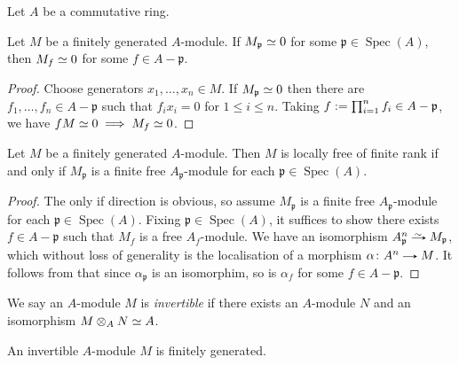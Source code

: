 
\begin{notation}
  Let $A$ be a commutative ring.
\end{notation}

\newcommand{\p}{\mathfrak{p}}
\newcommand{\Spec}{\operatorname{Spec}}

\begin{lemma}
  \label{trivial-point-to-open}
  Let $M$ be a finitely generated $A$-module. If $M_\p \iso 0$ for
  some $\p \in \Spec(A)$, then $M_f \simeq 0$ for some $f \in A - \p$.
\end{lemma}

\begin{proof}
  Choose generators $x_1,\ldots,x_n \in M$. If $M_\p \iso 0$ then
  there are $f_1,\ldots,f_n \in A - \p$ such that $f_ix_i = 0$ for $1
  \le i \le n$. Taking $f \ce \prod_{i=1}^n f_i \in A - \p$, we have
  $fM \simeq 0 \implies M_f \simeq 0$.
\end{proof}

\begin{lemma}
  \label{locally-free-point-to-open}
  Let $M$ be a finitely generated $A$-module. Then $M$ is locally free
  of finite rank if and only if $M_\p$ is a finite free $A_\p$-module
  for each $\p \in \Spec(A)$.
\end{lemma}

\begin{proof}
  The only if direction is obvious, so assume $M_\p$ is a finite free
  $A_\p$-module for each $\p \in \Spec(A)$. Fixing $\p \in \Spec(A)$,
  it suffices to show there exists $f \in A - \p$ such that $M_f$ is a
  free $A_f$-module. We have an isomorphism $A_\p^n \isoto M_\p$,
  which without loss of generality is the localisation of a morphism
  $\alpha \c A^n \to M$. It follows from 
  that since $\alpha_\p$ is an isomorphim, so is $\alpha_f$ for some
  $f \in A - \p$.
\end{proof}

\begin{definition}
  We say an $A$-module $M$ is \emph{invertible} if there exists an
  $A$-module $N$ and an isomorphism $M \otimes_A N \simeq A$.
\end{definition}

\begin{lemma}
  \label{invertible-module-finitely-generated}
  An invertible $A$-module $M$ is finitely generated.
\end{lemma}

\newcommand{\id}{\mathrm{id}}

